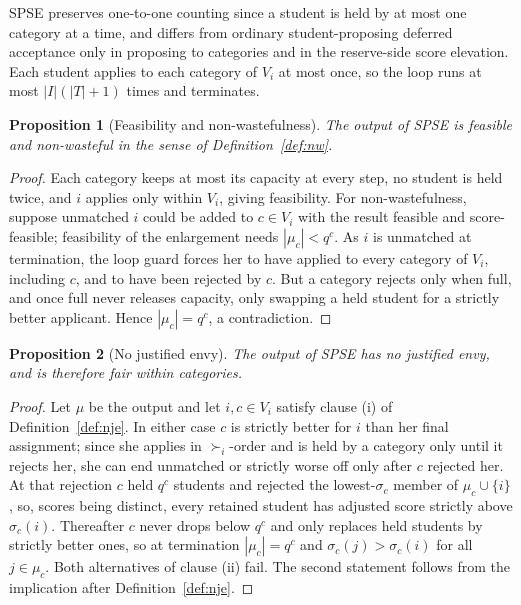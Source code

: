 \documentclass[a4paper,twoside]{article}
\newtheorem{proposition}{Proposition}
\theoremstyle{definition}
\begin{document}
SPSE preserves one-to-one counting since a student is held by at most one category at a time, and differs from ordinary student-proposing deferred acceptance only in proposing to categories and in the reserve-side score elevation. Each student applies to each category of $V_i$ at most once, so the loop runs at most $|I|(|T|+1)$ times and terminates.

\begin{proposition}[Feasibility and non-wastefulness]
\label{prop:spse-basic}
The output of SPSE is feasible and non-wasteful in the sense of Definition~\ref{def:nw}.
\end{proposition}

\begin{proof}
Each category keeps at most its capacity at every step, no student is held twice, and $i$ applies only within $V_i$, giving feasibility. For non-wastefulness, suppose unmatched $i$ could be added to $c\in V_i$ with the result feasible and score-feasible; feasibility of the enlargement needs $|\mu_c|<q^c$. As $i$ is unmatched at termination, the loop guard forces her to have applied to every category of $V_i$, including $c$, and to have been rejected by $c$. But a category rejects only when full, and once full never releases capacity, only swapping a held student for a strictly better applicant. Hence $|\mu_c|=q^c$, a contradiction.
\end{proof}

\begin{proposition}[No justified envy]
\label{prop:spse-nje}
The output of SPSE has no justified envy, and is therefore fair within categories.
\end{proposition}

\begin{proof}
Let $\mu$ be the output and let $i,c\in V_i$ satisfy clause (i) of Definition~\ref{def:nje}. In either case $c$ is strictly better for $i$ than her final assignment; since she applies in $\succ_i$-order and is held by a category only until it rejects her, she can end unmatched or strictly worse off only after $c$ rejected her. At that rejection $c$ held $q^c$ students and rejected the lowest-$\sigma_c$ member of $\mu_c\cup\{i\}$, so, scores being distinct, every retained student has adjusted score strictly above $\sigma_c(i)$. Thereafter $c$ never drops below $q^c$ and only replaces held students by strictly better ones, so at termination $|\mu_c|=q^c$ and $\sigma_c(j)>\sigma_c(i)$ for all $j\in\mu_c$. Both alternatives of clause (ii) fail. The second statement follows from the implication after Definition~\ref{def:nje}.
\end{proof}
\end{document}
